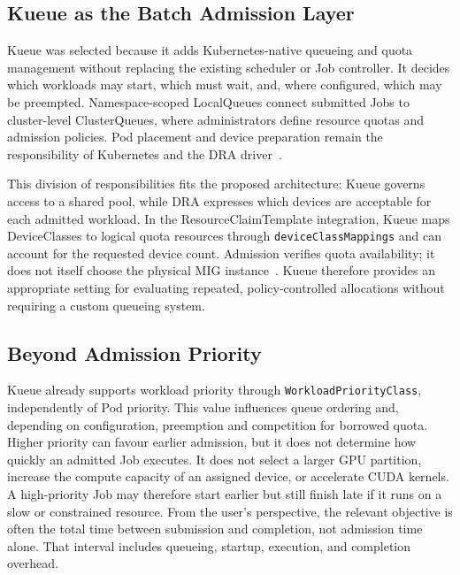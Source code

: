 \subsection{Kueue as the Batch Admission Layer}
\label{subsec:kueue-admission-layer}

Kueue was selected because it adds Kubernetes-native queueing and quota management without replacing the existing scheduler or Job controller. It decides which workloads may start, which must wait, and, where configured, which may be preempted. Namespace-scoped LocalQueues connect submitted Jobs to cluster-level ClusterQueues, where administrators define resource quotas and admission policies. Pod placement and device preparation remain the responsibility of Kubernetes and the DRA driver~\cite{kueue2026overview}.

This division of responsibilities fits the proposed architecture: Kueue governs access to a shared pool, while DRA expresses which devices are acceptable for each admitted workload. In the ResourceClaimTemplate integration, Kueue maps DeviceClasses to logical quota resources through \texttt{deviceClassMappings} and can account for the requested device count. Admission verifies quota availability; it does not itself choose the physical MIG instance~\cite{kueue2026dra}. Kueue therefore provides an appropriate setting for evaluating repeated, policy-controlled allocations without requiring a custom queueing system.

\subsection{Beyond Admission Priority}
\label{subsec:gpu-aware-service-classes}

Kueue already supports workload priority through \texttt{WorkloadPriorityClass}, independently of Pod priority. This value influences queue ordering and, depending on configuration, preemption and competition for borrowed quota. Higher priority can favour earlier admission, but it does not determine how quickly an admitted Job executes. It does not select a larger GPU partition, increase the compute capacity of an assigned device, or accelerate CUDA kernels. A high-priority Job may therefore start earlier but still finish late if it runs on a slow or constrained resource. From the user's perspective, the relevant objective is often the total time between submission and completion, not admission time alone. That interval includes queueing, startup, execution, and completion overhead.

